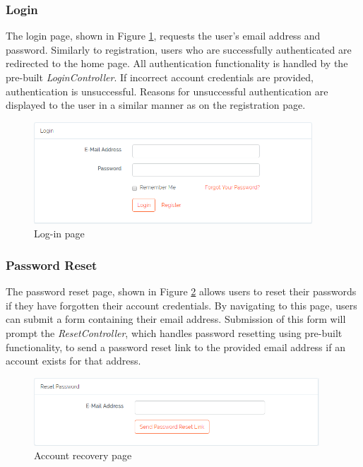 \subsubsection{Login}
The login page, shown in Figure \ref{fig:LoginPage}, requests the user's email address and password. Similarly to registration, users who are successfully authenticated are redirected to the home page. All authentication functionality is handled by the pre-built \textit{LoginController}. If incorrect account credentials are provided, authentication is unsuccessful. Reasons for unsuccessful authentication are displayed to the user in a similar manner as on the registration page.

\begin{figure}[H]
\centering
\includegraphics[height=1.5in]{Images/Design/login-page}
\caption{Log-in page}
\label{fig:LoginPage}
\end{figure}

\subsubsection{Password Reset}
The password reset page, shown in Figure \ref{fig:PasswordReset} allows users to reset their passwords if they have forgotten their account credentials. By navigating to this page, users can submit a form containing their email address. Submission of this form will prompt the \textit{ResetController}, which handles password resetting using pre-built functionality, to send a password reset link to the provided email address if an account exists for that address.

\begin{figure}[H]
\centering
\includegraphics[height=1in]{Images/Implementation/PasswordReset}
\caption{Account recovery page}
\label{fig:PasswordReset}
\end{figure}

